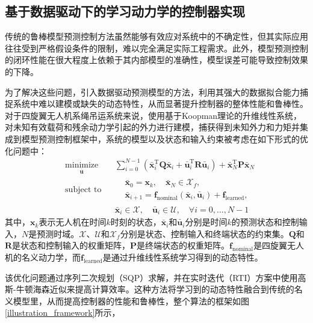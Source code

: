 \documentclass[lang=chs, degree=master, blindreview=false, winfonts=true]{yanputhesis}
\begin{document}
\subsection{基于数据驱动下的学习动力学的控制器实现}

传统的鲁棒模型预测控制方法虽然能够有效应对系统中的不确定性，但其实际应用往往受到严格假设条件的限制，难以完全满足实际工程需求。此外，模型预测控制的闭环性能在很大程度上依赖于其内部模型的准确性，模型误差可能导致控制效果的下降。

为了解决这些问题，引入数据驱动预测模型的方法，利用其强大的数据拟合能力捕捉系统中难以建模或缺失的动态特性，从而显著提升控制器的整体性能和鲁棒性。
对于四旋翼无人机系绳吊运系统来说，使用基于Koopman理论的升维线性系统，对未知有效载荷和残余动力学引起的外力进行建模，捕获得到未知外力和力矩并集成到模型预测控制框架中，系统的模型以及状态和输入约束被考虑在如下形式的优化问题中：
\begin{equation}
	\begin{aligned} \label{nmpc}
		&\operatorname*{minimize}_{\bm{\bar{u}}}& & \sum_{i=0}^{N-1}\left(\bm{\bar{x}}_i^\mathrm{T}\bm{Q}\bm{\bar{x}}_i + \bm{\bar{u}}_i^\mathrm{T}\bm{R}\bm{\bar{u}}_i\right) + \bm{\bar{x}}_N^\mathrm{T}\bm{P}\bm{\bar{x}}_N  \\
		&\text{subject to}& & \begin{aligned}
			&\bm{\bar{x}}_{0} = \bm{x}_k, \quad \bm{\bar{x}}_{N} \in \mathcal{X}_f, \\
			&\bm{\bar{x}}_{i+1} = \bm{f}_{\text{nominal}}(\bm{\bar{x}}_i, \bm{\bar{u}}_i) + \bm{f}_{\text{learned}},
		\end{aligned} \\
		&&& \bm{\bar{x}}_i \in \mathcal{X}, \quad \bm{\bar{u}}_i \in \mathcal{U}, \quad \forall i = 0, \ldots, N-1
	\end{aligned}
\end{equation}
其中，$\bm{x}_k$表示无人机在时间$k$时刻的状态，$\bm{\bar{x}}_i$和$\bm{\bar{u}}_i$分别是时间$k$的预测状态和控制输入，$N$是预测时域。$\mathcal{X}$、$\mathcal{U}$和$\mathcal{X}_f$分别是状态、控制输入和终端状态的约束集。$\bm{Q}$和$\bm{R}$是状态和控制输入的权重矩阵，$\bm{P}$是终端状态的权重矩阵。$\bm{f}_{\text{nominal}}$是四旋翼无人机的名义动力学，而$\bm{f}_{\text{learned}}$是通过升维线性系统学习得到的动态特性。

该优化问题通过序列二次规划（SQP）求解，并在实时迭代（RTI）方案中使用高斯-牛顿海森近似来提高计算效率。这种方法将学习到的动态特性融合到传统的名义模型里，从而提高控制器的性能和鲁棒性，整个算法的框架如图\ref{illustration_framework}所示，
\end{document}
